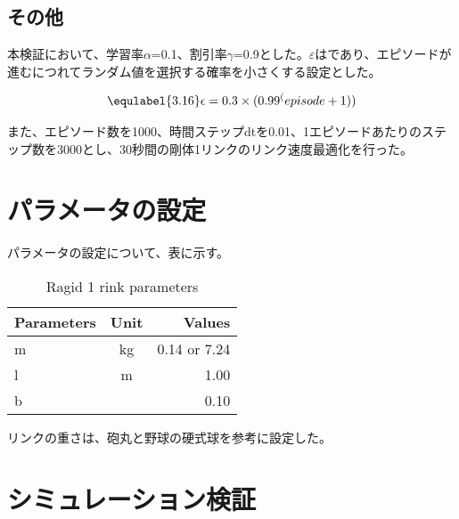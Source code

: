 \subsection{その他}
本検証において、学習率$\alpha$=0.1、割引率$\gamma$=0.9とした。$\varepsilon$はであり、エピソードが進むにつれてランダム値を選択する確率を小さくする設定とした。

\begin{eqnarray}
  \equlabel{3.16}
  \epsilon = 0.3 \times ({0.99}^(episode + 1))
\end{eqnarray}

また、エピソード数を1000、時間ステップdtを0.01、1エピソードあたりのステップ数を3000とし、30秒間の剛体1リンクのリンク速度最適化を行った。
\section{パラメータの設定}
パラメータの設定について、表に示す。
\begin{table}[tb]
  \begin{center}
    \caption{Ragid 1 rink parameters}
    \begin{tabular}{l|c|r}
      \hline
      Parameters & Unit & Values \\
      \hline
      m & kg & 0.14 or 7.24 \\
      l & m & 1.00 \\
      b &  & 0.10 \\
      \hline
    \end{tabular}
  \end{center}
\end{table}
リンクの重さは、砲丸と野球の硬式球を参考に設定した。
\section{シミュレーション検証}

